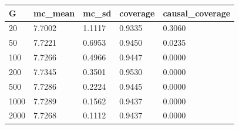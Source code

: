 \begin{tabular}{lllll}
\hline
G & mc\_mean & mc\_sd & coverage & causal\_coverage \\
\hline
20 & 7.7002 & 1.1117 & 0.9335 & 0.3060 \\
50 & 7.7221 & 0.6953 & 0.9450 & 0.0235 \\
100 & 7.7266 & 0.4966 & 0.9447 & 0.0000 \\
200 & 7.7345 & 0.3501 & 0.9530 & 0.0000 \\
500 & 7.7286 & 0.2224 & 0.9445 & 0.0000 \\
1000 & 7.7289 & 0.1562 & 0.9437 & 0.0000 \\
2000 & 7.7268 & 0.1112 & 0.9437 & 0.0000 \\
\hline
\end{tabular}

